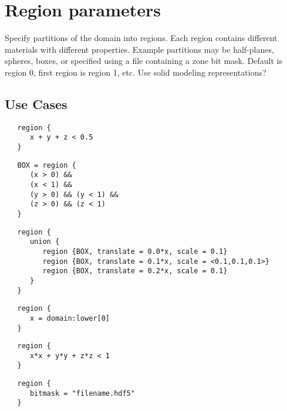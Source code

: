 \documentclass{book}
\begin{document}
\section{Region parameters} \label{s:region}

Specify partitions of the domain into regions.  Each region contains
different materials with different properties.  Example partitions may
be half-planes, spheres, boxes, or specified using a file containing a
zone bit mask.  Default is region 0, first region is region 1, etc.
Use solid modeling representations?

\subsection{Use Cases}

\begin{verbatim}
   region {
      x + y + z < 0.5
   }
\end{verbatim}

\begin{verbatim}
   BOX = region {
      (x > 0) &&
      (x < 1) &&
      (y > 0) && (y < 1) &&
      (z > 0) && (z < 1)
   }
\end{verbatim}

\begin{verbatim}
   region {
      union {
         region {BOX, translate = 0.0*x, scale = 0.1}
         region {BOX, translate = 0.1*x, scale = <0.1,0.1,0.1>}
         region {BOX, translate = 0.2*x, scale = 0.1}
      }
   }
\end{verbatim}

\begin{verbatim}
   region {
      x = domain:lower[0]
   }
\end{verbatim}

\begin{verbatim}
   region {
      x*x + y*y + z*z < 1
   }
\end{verbatim}

\begin{verbatim}
   region {
      bitmask = "filename.hdf5"
   }
\end{verbatim}


\end{document}

